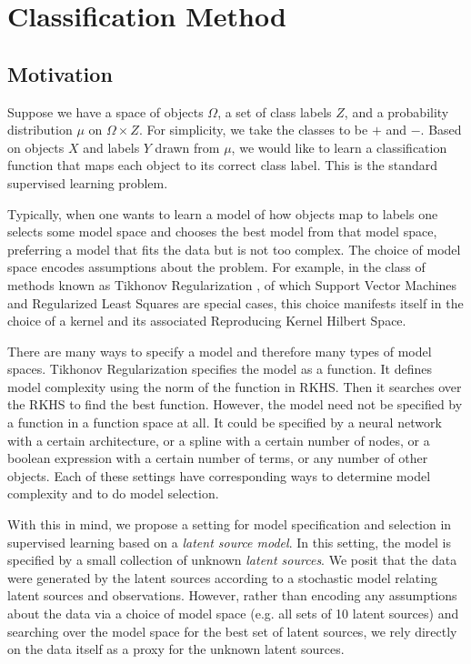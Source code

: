 \chapter{Classification Method}
\label{ch:method}

\section{Motivation}
Suppose we have a space of objects $\Omega$, a set of class labels $Z$, and a
probability distribution $\mu$ on $\Omega \times Z$. For simplicity, we take the
classes to be $+$ and $-$. Based on objects $X$ and labels $Y$ drawn from $\mu$,
we would like to learn a classification function that maps each object to its
correct class label. This is the standard supervised learning problem.

Typically, when one wants to learn a model of how objects map to labels one
selects some model space and chooses the best model from that model space,
preferring a model that fits the data but is not too complex. The choice of model
space encodes assumptions about the problem. For example, in the class of
methods known as Tikhonov Regularization \cite{Poggio}\cite{Bauer}, of which
Support Vector Machines and Regularized Least Squares are special cases, this
choice manifests itself in the choice of a kernel and its associated Reproducing
Kernel Hilbert Space.

There are many ways to specify a model and therefore many types of model
spaces. Tikhonov Regularization specifies the model as a function. It defines
model complexity using the norm of the function in RKHS. Then it searches over
the RKHS to find the best function. However, the model need not be specified by
a function in a function space at all. It could be specified by a neural network
with a certain architecture, or a spline with a certain number of nodes, or a
boolean expression with a certain number of terms, or any number of other
objects. Each of these settings have corresponding ways to determine model
complexity and to do model selection.

With this in mind, we propose a setting for model specification and selection in
supervised learning based on a {\em latent source model}. In this setting, the
model is specified by a small collection of unknown {\em latent sources}. We
posit that the data were generated by the latent sources according to a
stochastic model relating latent sources and observations. However, rather than
encoding any assumptions about the data via a choice of model space (e.g. all
sets of 10 latent sources) and searching over the model space for the best set
of latent sources, we rely directly on the data itself as a proxy for the
unknown latent sources.

